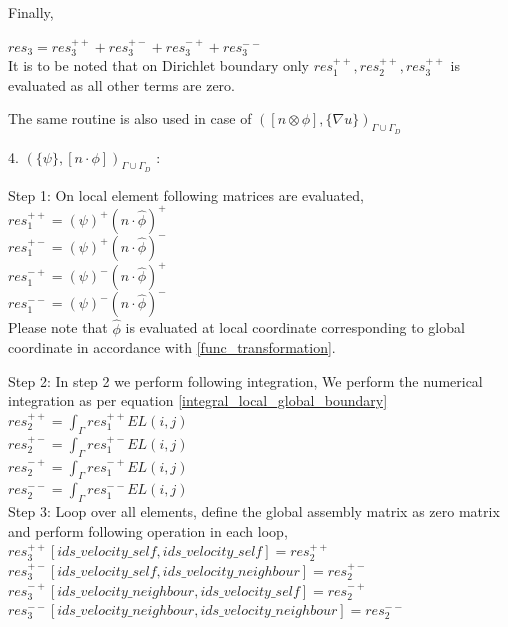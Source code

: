 \documentclass[a4paper]{book}
\begin{document}
Finally,

$res_3 = res_3^{++} + res_3^{+-} + res_3^{-+} + res_3^{--}$\\

It is to be noted that on Dirichlet boundary only $res_1^{++}, res_2^{++}, res_3^{++}$ is evaluated as all other terms are zero.

The same routine is also used in case of $([n \otimes \phi],\lbrace \nabla u \rbrace )_{\Gamma \cup \Gamma_D}$

4. $(\lbrace \psi \rbrace, [n \cdot \phi])_{\Gamma \cup \Gamma_D}$ :

Step 1: On local element following matrices are evaluated,\\

$res_1^{++} = (\psi)^+ (n \cdot \hat{\phi})^+$\\
$res_1^{+-} = (\psi)^+ (n \cdot \hat{\phi})^-$\\
$res_1^{-+} = (\psi)^- (n \cdot \hat{\phi})^+$\\
$res_1^{--} = (\psi)^- (n \cdot \hat{\phi})^-$\\

Please note that $\hat{\phi}$ is evaluated at local coordinate corresponding to global coordinate in accordance with \ref{func_transformation}.

Step 2: In step 2 we perform following integration, 
We perform the numerical integration as per equation \ref{integral_local_global_boundary}
\\ 
$res_2^{++} = \int_{\Gamma} res_1^{++} EL(i,j)$\\
$res_2^{+-} = \int_{\Gamma} res_1^{+-} EL(i,j)$\\
$res_2^{-+} = \int_{\Gamma} res_1^{-+} EL(i,j)$\\
$res_2^{--} = \int_{\Gamma} res_1^{--} EL(i,j)$\\

Step 3: Loop over all elements, define the global assembly matrix as zero matrix and perform following operation in each loop,
\\
$res_3^{++}[ids\_velocity\_self,ids\_velocity\_self] = res_2^{++}$\\
$res_3^{+-}[ids\_velocity\_self,ids\_velocity\_neighbour] = res_2^{+-}$\\
$res_3^{-+}[ids\_velocity\_neighbour,ids\_velocity\_self] = res_2^{-+}$\\
$res_3^{--}[ids\_velocity\_neighbour,ids\_velocity\_neighbour] = res_2^{--}$\\
\end{document}

